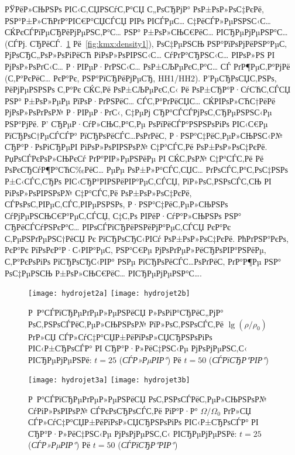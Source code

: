 \begin{enumerate}
РЎРёР»СЊРЅРѕ РІС‹С‚СЏРЅСѓС‚Р°СЏ С„РѕСЂРјР° РѕР±РѕР»РѕС‡РєРё, РЅР°Р±Р»СЋРґР°РІС€Р°СЏСЃСЏ РІРѕ РІСЃРµС… С‡РёСЃР»РµРЅРЅС‹С…
СЌРєСЃРїРµСЂРёРјРµРЅС‚Р°С… РЅР° Р±РѕР»СЊС€РёС… РІСЂРµРјРµРЅР°С… (СЃРј. СЂРёСЃ.~\ref{fig:kmx:density2}
Рё~\ref{fig:kmx:density1}), РѕС‡РµРЅСЊ РЅР°РїРѕРјРёРЅР°РµС‚ РјРѕСЂС„РѕР»РѕРіРёСЋ РіРѕР»РѕРІРЅС‹С… СѓРґР°СЂРЅС‹С…
РІРѕР»РЅ РІ РјРѕР»РѕРґС‹С… Р·РІРµР·РґРЅС‹С… РѕР±СЉРµРєС‚Р°С… СЃ РґР¶РµС‚Р°РјРё (С‚Р°РєРёС… РєР°Рє, РЅР°РїСЂРёРјРµСЂ, HH1/HH2).
Р’РµСЂРѕСЏС‚РЅРѕ, РёРјРµРЅРЅРѕ С‚Р°Рє СЌС‚Рё РѕР±СЉРµРєС‚С‹ Рё РѕР±СЂР°Р·СѓСЋС‚СЃСЏ РЅР° Р±РѕР»РµРµ РїРѕР·РґРЅРёС… СЃС‚Р°РґРёСЏС…
СЌРІРѕР»СЋС†РёРё РјРѕР»РѕРґРѕР№ Р·РІРµР·РґС‹, С‡РµРј СЂР°СЃСЃРјРѕС‚СЂРµРЅРЅС‹Рµ РЅР°РјРё. Р’ СЂРµР·СѓР»СЊС‚Р°С‚Рµ РѕРїРёСЃР°РЅРЅРѕРіРѕ
РІС‹С€Рµ РїСЂРѕС†РµСЃСЃР° РїСЂРѕРёСЃС…РѕРґРёС‚ Р·РЅР°С‡РёС‚РµР»СЊРЅС‹Р№ СЂР°Р·РѕРіСЂРµРІ РіРѕР»РѕРІРЅРѕР№ С‡Р°СЃС‚Рё РѕР±РѕР»РѕС‡РєРё.
РџРѕСЃРєРѕР»СЊРєСѓ РґР°РІР»РµРЅРёРµ РІ СЌС‚РѕР№ С‡Р°СЃС‚Рё Рё РѕРєСЂСѓР¶Р°СЋС‰РёС… РµРµ РѕР±Р»Р°СЃС‚СЏС… РґРѕСЃС‚Р°С‚РѕС‡РЅРѕ Р±С‹СЃС‚СЂРѕ
РІС‹СЂР°РІРЅРёРІР°РµС‚СЃСЏ, РїР»РѕС‚РЅРѕСЃС‚СЊ РІ РіРѕР»РѕРІРЅРѕР№ С‡Р°СЃС‚Рё РѕР±РѕР»РѕС‡РєРё, СЃРѕРѕС‚РІРµС‚СЃС‚РІРµРЅРЅРѕ,
Р·РЅР°С‡РёС‚РµР»СЊРЅРѕ СѓРјРµРЅСЊС€Р°РµС‚СЃСЏ, С‡С‚Рѕ РІРёР·СѓР°Р»СЊРЅРѕ РЅР° СЂРёСЃСѓРЅРєР°С… РІРѕСЃРїСЂРёРЅРёРјР°РµС‚СЃСЏ
РєР°Рє С‚РµРЅРґРµРЅС†РёСЏ Рє РїСЂРѕСЂС‹РІСѓ РѕР±РѕР»РѕС‡РєРё. РћРґРЅР°РєРѕ, РєР°Рє РїРѕРєР°Р·С‹РІР°РµС‚ РЅР°С€Рµ
РјРѕРґРµР»РёСЂРѕРІР°РЅРёРµ, С‚Р°РєРѕРіРѕ РїСЂРѕСЂС‹РІР° РЅРµ РїСЂРѕРёСЃС…РѕРґРёС‚ РґР°Р¶Рµ РЅР° РѕС‡РµРЅСЊ Р±РѕР»СЊС€РёС…
РІСЂРµРјРµРЅР°С….

\begin{figure}[!h]
\centering
\texttt{[image: hydrojet2a]}
\texttt{[image: hydrojet2b]}
\caption{Р Р°СЃРїСЂРµРґРµР»РµРЅРёСЏ Р»РѕРіР°СЂРёС„РјР° РѕС‚РЅРѕСЃРёС‚РµР»СЊРЅРѕР№ РїР»РѕС‚РЅРѕСЃС‚Рё ${\lg(\rho/\rho_0)}$ РґР»СЏ СЃР»СѓС‡Р°СЏ\plb Р±РёРїРѕР»СЏСЂРЅРѕРіРѕ РІС‹Р±СЂРѕСЃР° РІ СЂР°Р·Р»РёС‡РЅС‹Рµ РјРѕРјРµРЅС‚С‹ РІСЂРµРјРµРЅРё: ${t = 25}$ (\emph{СЃР»РµРІР°}) Рё ${t = 50}$ (\emph{СЃРїСЂР°РІР°})}
\label{fig:kmx:density2}
\end{figure}

\begin{figure}[!h]
\centering
\texttt{[image: hydrojet3a]}
\texttt{[image: hydrojet3b]}
\caption{Р Р°СЃРїСЂРµРґРµР»РµРЅРёСЏ РѕС‚РЅРѕСЃРёС‚РµР»СЊРЅРѕР№ СѓРіР»РѕРІРѕР№ СЃРєРѕСЂРѕСЃС‚Рё РіР°Р·Р° ${\Omega/\Omega_0}$ РґР»СЏ СЃР»СѓС‡Р°СЏ\plb Р±РёРїРѕР»СЏСЂРЅРѕРіРѕ РІС‹Р±СЂРѕСЃР° РІ СЂР°Р·Р»РёС‡РЅС‹Рµ РјРѕРјРµРЅС‚С‹ РІСЂРµРјРµРЅРё: ${t = 25}$ (\emph{СЃР»РµРІР°}) Рё ${t = 50}$ (\emph{СЃРїСЂР°РІР°})}
\label{fig:kmx:omega2}
\end{figure}


\end{enumerate}
